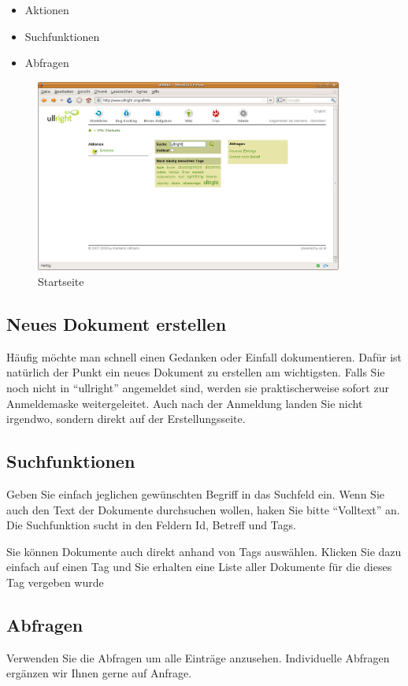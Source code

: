 \documentclass[article, a4paper, oneside, 11pt]{memoir}
\begin{document}
\begin{itemize}
\item Aktionen
\item Suchfunktionen
\item Abfragen
\end{itemize}

\begin{figure}[htp]
\centering
\includegraphics[width=0.9\textwidth]{index}
\caption{Startseite}
\label{fig:index}
\end{figure}

\subsection{Neues Dokument erstellen}
Häufig möchte man schnell einen Gedanken oder Einfall dokumentieren. Dafür ist natürlich der Punkt ein neues Dokument zu erstellen am wichtigsten. Falls Sie noch nicht in "`ullright"' angemeldet sind, werden sie praktischerweise sofort zur Anmeldemaske weitergeleitet. Auch nach der Anmeldung landen Sie nicht irgendwo, sondern direkt auf der Erstellungsseite.

\subsection{Suchfunktionen}
Geben Sie einfach jeglichen gewünschten Begriff in das Suchfeld ein. Wenn Sie auch den Text der Dokumente durchsuchen wollen, haken Sie bitte "`Volltext"' an. Die Suchfunktion sucht in den Feldern Id, Betreff und Tags.

Sie können Dokumente auch direkt anhand von Tags auswählen. Klicken Sie dazu einfach auf einen Tag und Sie erhalten eine Liste aller Dokumente für die dieses Tag vergeben wurde

\subsection{Abfragen}
Verwenden Sie die Abfragen um alle Einträge anzusehen. Individuelle Abfragen ergänzen wir Ihnen gerne auf Anfrage.
\end{document}
